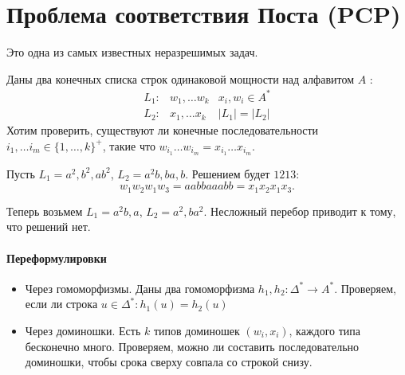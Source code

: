 \section{Проблема соответствия Поста (PCP)}
Это одна из самых известных неразрешимых задач.

Даны два конечных списка строк одинаковой мощности над алфавитом $ A$ :
\[
\begin{aligned}
	L_1 :& w_1, \ldots w_k & x_i, w_i \in A^{*} \\
	L_2: & x_1, \ldots x_k & \lvert L_1 \rvert = \lvert L_2 \rvert  
\end{aligned}
\]
Хотим проверить, существуют ли конечные последовательности $  i_1, \ldots i_m \in \{1, \ldots , k\}^+$, такие что $ w_{i_1}\ldots w_{i_m} = x_{i_1}\ldots x_{i_m}$.


\begin{ex}
    Пусть $  L_1 = a^2, b^2, ab ^2$, $  L_2 = a^2b, ba, b$. Решением будет $ 1213$:
	 \[
	w_1 w_2 w_1 w_3 = aabbaaabb = x_1x_2x_1x_3
	.\] 
\end{ex}
\begin{ex}
    Теперь возьмем  $  L_1 = a^2b, a$, $  L_2 = a^2, ba^2$. Несложный перебор приводит к тому, что решений нет.
\end{ex}

\paragraph{Переформулировки}
\begin{itemize}
	\item Через гомоморфизмы. Даны два гомоморфизма $ h_1, h_2\colon \Delta^{*} \to A^{*}$. Проверяем, если ли строка $ u \in \Delta^{*}\colon h_1(u) = h_2(u)$ 
	\item Через доминошки. Есть $ k$ типов доминошек $ (w_i, x_i)$, каждого типа бесконечно много. Проверяем, можно ли составить последовательно доминошки, чтобы срока сверху совпала со строкой снизу.
\end{itemize}


